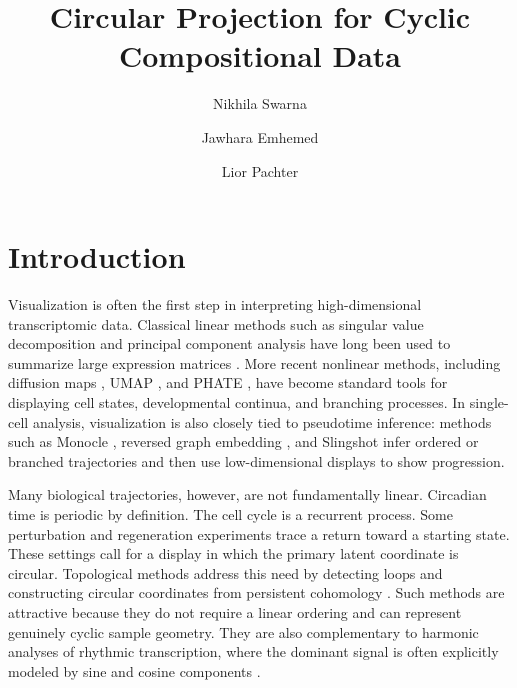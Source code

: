 \documentclass[10pt,twocolumn]{article}
\title{Circular Projection for Cyclic Compositional Data}
\author[1]{Nikhila Swarna}
\author[1]{Jawhara Emhemed}
\author[1,*]{Lior Pachter}
\affil[1]{Division of Biology and Biological Engineering, California Institute of Technology, Pasadena, CA}
\affil[*]{Address correspondence to: \href{mailto:lpachter@caltech.edu}{lpachter@caltech.edu}}
\date{}
\begin{document}
\thispagestyle{firststyle}


\section{Introduction}

Visualization is often the first step in interpreting high-dimensional
transcriptomic data. Classical linear methods such as singular value
decomposition and principal component analysis have long been used to summarize
large expression matrices \citep{Alter_2000}. More recent nonlinear methods,
including diffusion maps \citep{Coifman_2005}, UMAP \citep{McInnes_2018}, and
PHATE \citep{Moon_2019}, have become standard tools for displaying cell states,
developmental continua, and branching processes. In single-cell analysis,
visualization is also closely tied to pseudotime inference: methods such as
Monocle \citep{Trapnell_2014}, reversed graph embedding
\citep{Qiu_2017}, and Slingshot \citep{Street_2018} infer ordered or branched
trajectories and then use low-dimensional displays to show progression.

Many biological trajectories, however, are not fundamentally linear. Circadian
time is periodic by definition. The cell cycle is a recurrent process. Some
perturbation and regeneration experiments trace a return toward a starting
state. These settings call for a display in which the primary latent coordinate
is circular. Topological methods address this need by detecting loops and
constructing circular coordinates from persistent cohomology
\citep{de_Silva_2011}. Such methods are attractive because they do not require a
linear ordering and can represent genuinely cyclic sample geometry. They are
also complementary to harmonic analyses of rhythmic transcription, where the
dominant signal is often explicitly modeled by sine and cosine components
\citep{Hughes_2009}.
\end{document}
